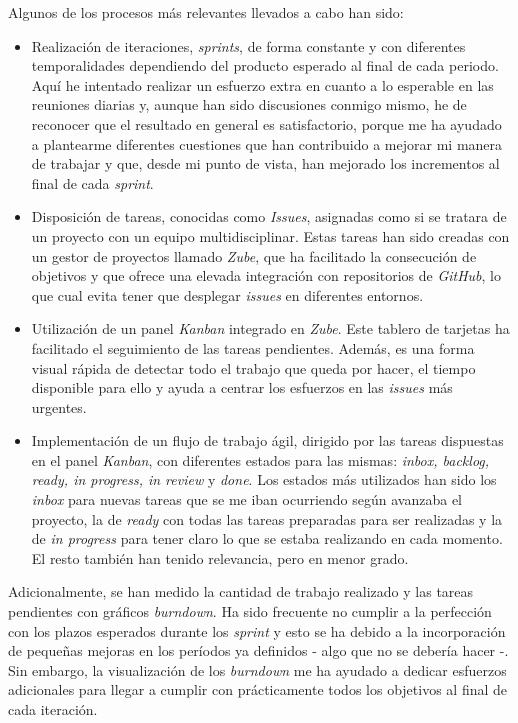 Algunos de los procesos más relevantes llevados a cabo han sido:

\begin{itemize}
\tightlist
\item  
Realización de iteraciones, \emph{sprints}, de forma constante y con diferentes temporalidades dependiendo del producto esperado al final de cada periodo. Aquí he intentado realizar un esfuerzo extra en cuanto a lo esperable en las reuniones diarias y, aunque han sido discusiones conmigo mismo, he de reconocer que el resultado en general es satisfactorio, porque me ha ayudado a plantearme diferentes cuestiones que han contribuido a mejorar mi manera de trabajar y que, desde mi punto de vista, han mejorado los incrementos al final de cada \emph{sprint}. 
\item
Disposición de tareas, conocidas como \emph{Issues}\citep{wiki:issue}, asignadas como si se tratara de un proyecto con un equipo multidisciplinar. Estas tareas han sido creadas con un gestor de proyectos llamado \emph{Zube}, que ha facilitado la consecución de objetivos y que ofrece una elevada integración con repositorios de \emph{GitHub}, lo que cual evita tener que desplegar \emph{issues} en diferentes entornos. 
\item
Utilización de un panel \emph{Kanban} integrado en \emph{Zube}. Este tablero de tarjetas ha facilitado el seguimiento de las tareas pendientes. Además, es una forma visual rápida de detectar todo el trabajo que queda por hacer, el tiempo disponible para ello y ayuda a centrar los esfuerzos en las \emph{issues} más urgentes. 
\item
Implementación de un flujo de trabajo ágil, dirigido por las tareas dispuestas en el panel \emph{Kanban}, con diferentes estados para las mismas: \emph{inbox, backlog, ready, in progress, in review} y \emph{done}. Los estados más utilizados han sido los \emph{inbox} para nuevas tareas que se me iban ocurriendo según avanzaba el proyecto, la de \emph{ready} con todas las tareas preparadas para ser realizadas y la de \emph{in progress} para tener claro lo que se estaba realizando en cada momento. El resto también han tenido relevancia, pero en menor grado. 
\end{itemize}

Adicionalmente, se han medido la cantidad de trabajo realizado y las tareas pendientes con gráficos \emph{burndown}\citep{wiki:burndown}. Ha sido frecuente no cumplir a la perfección con los plazos esperados durante los \emph{sprint} y esto se ha debido a la incorporación de pequeñas mejoras en los períodos ya definidos - algo que no se debería hacer -. Sin embargo, la visualización de los \emph{burndown} me ha ayudado a dedicar esfuerzos adicionales para llegar a cumplir con prácticamente todos los objetivos al final de cada iteración. 

